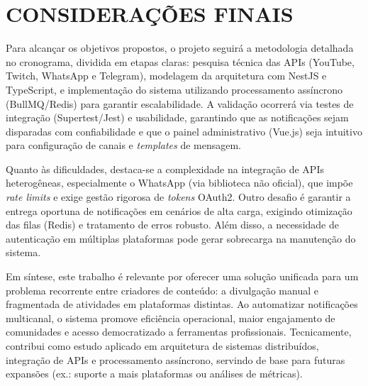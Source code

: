 
\section{CONSIDERAÇÕES FINAIS} %
\label{sec:conclusao}




Para alcançar os objetivos propostos, o projeto seguirá a metodologia detalhada no cronograma, dividida em etapas claras: pesquisa técnica das APIs (YouTube, Twitch, WhatsApp e Telegram), modelagem da arquitetura com NestJS e TypeScript, e implementação do sistema utilizando processamento assíncrono (BullMQ/Redis) para garantir escalabilidade. A validação ocorrerá via testes de integração (Supertest/Jest) e usabilidade, garantindo que as notificações sejam disparadas com confiabilidade e que o painel administrativo (Vue.js) seja intuitivo para configuração de canais e \textit{templates} de mensagem.

Quanto às dificuldades, destaca-se a complexidade na integração de APIs heterogêneas, especialmente o WhatsApp (via biblioteca não oficial), que impõe \textit{rate limits} e exige gestão rigorosa de \textit{tokens} OAuth2. Outro desafio é garantir a entrega oportuna de notificações em cenários de alta carga, exigindo otimização das filas (Redis) e tratamento de erros robusto. Além disso, a necessidade de autenticação em múltiplas plataformas pode gerar sobrecarga na manutenção do sistema.

Em síntese, este trabalho é relevante por oferecer uma solução unificada para um problema recorrente entre criadores de conteúdo: a divulgação manual e fragmentada de atividades em plataformas distintas. Ao automatizar notificações multicanal, o sistema promove eficiência operacional, maior engajamento de comunidades e acesso democratizado a ferramentas profissionais. Tecnicamente, contribui como estudo aplicado em arquitetura de sistemas distribuídos, integração de APIs e processamento assíncrono, servindo de base para futuras expansões (ex.: suporte a mais plataformas ou análises de métricas).

